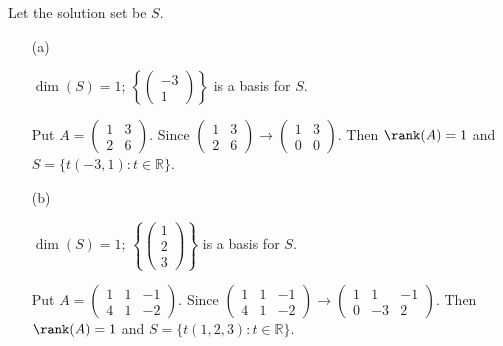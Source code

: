 \begin{Exercise}
	Let the solution set be $S$.
	\begin{enumerate}[(a)]
		\item[(a)]
		\begin{answer}
			$\dim(S) = 1$; $\left\{\begin{pmatrix}
			-3 \\
			1
			\end{pmatrix}\right\}$ is a basis for $S$.
		\end{answer}
		\begin{solution}
			Put $A = \begin{pmatrix}
			1 & 3 \\
			2 & 6
			\end{pmatrix}$. Since $\begin{pmatrix}
			1 & 3 \\
			2 & 6
			\end{pmatrix} \longrightarrow \begin{pmatrix}
			1 & 3 \\
			0 & 0
			\end{pmatrix}$. Then $\rank(A) = 1$ and $S=\{t(-3,1):t\in \mathbb{R}\}$.
		\end{solution}
		
		\item[(b)]
		\begin{answer}
			$\dim(S) = 1$; $\left\{\begin{pmatrix}
			1 \\
			2 \\
			3
			\end{pmatrix}\right\}$ is a basis for $S$.
		\end{answer}
		\begin{solution}
			Put $A = \begin{pmatrix}
			1 & 1 & -1 \\
			4 & 1 & -2
			\end{pmatrix}$. Since $\begin{pmatrix}
			1 & 1 & -1 \\
			4 & 1 & -2
			\end{pmatrix} \longrightarrow \begin{pmatrix}
			1 & 1 & -1 \\
			0 & -3 & 2
			\end{pmatrix}$. Then $\rank(A) = 1$ and $S=\{t(1,2,3):t\in \mathbb{R}\}$.
		\end{solution}
		
	\end{enumerate}
\end{Exercise}